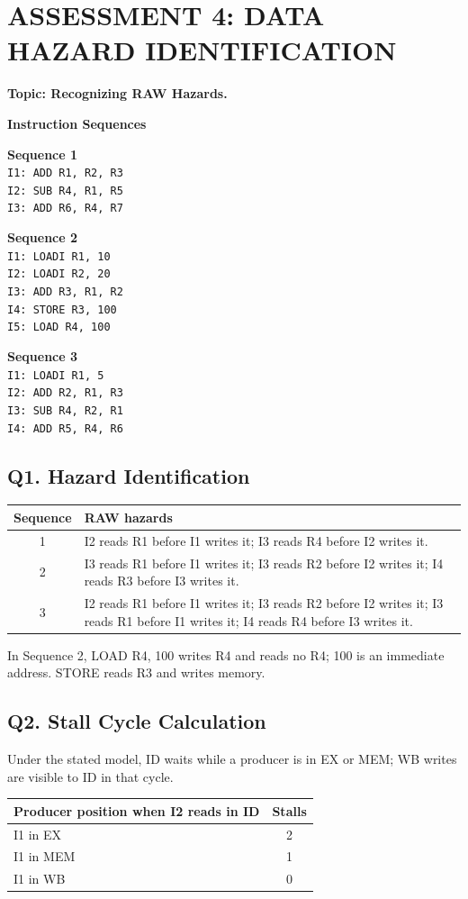 \documentclass[11pt,letterpaper]{article}
\begin{document}
\section{ASSESSMENT 4: DATA HAZARD IDENTIFICATION}
\textbf{Topic: Recognizing RAW Hazards.}

\textbf{Instruction Sequences}

\textbf{Sequence 1}\\
\texttt{I1: ADD R1, R2, R3}\\
\texttt{I2: SUB R4, R1, R5}\\
\texttt{I3: ADD R6, R4, R7}

\textbf{Sequence 2}\\
\texttt{I1: LOADI R1, 10}\\
\texttt{I2: LOADI R2, 20}\\
\texttt{I3: ADD R3, R1, R2}\\
\texttt{I4: STORE R3, 100}\\
\texttt{I5: LOAD R4, 100}

\textbf{Sequence 3}\\
\texttt{I1: LOADI R1, 5}\\
\texttt{I2: ADD R2, R1, R3}\\
\texttt{I3: SUB R4, R2, R1}\\
\texttt{I4: ADD R5, R4, R6}

\subsection*{Q1. Hazard Identification}
\begin{center}\begin{tabularx}{\linewidth}{|c|X|}\hline\textbf{Sequence}&\textbf{RAW hazards}\\\hline
1&I2 reads R1 before I1 writes it; I3 reads R4 before I2 writes it.\\\hline
2&I3 reads R1 before I1 writes it; I3 reads R2 before I2 writes it; I4 reads R3 before I3 writes it.\\\hline
3&I2 reads R1 before I1 writes it; I3 reads R2 before I2 writes it; I3 reads R1 before I1 writes it; I4 reads R4 before I3 writes it.\\\hline\end{tabularx}\end{center}
In Sequence 2, LOAD R4, 100 writes R4 and reads no R4; 100 is an immediate address. STORE reads R3 and writes memory.
\subsection*{Q2. Stall Cycle Calculation}
Under the stated model, ID waits while a producer is in EX or MEM; WB writes are visible to ID in that cycle.
\begin{center}\begin{tabular}{|p{3.5in}|c|}\hline\textbf{Producer position when I2 reads in ID}&\textbf{Stalls}\\\hline I1 in EX&2\\\hline I1 in MEM&1\\\hline I1 in WB&0\\\hline\end{tabular}\end{center}
\end{document}
